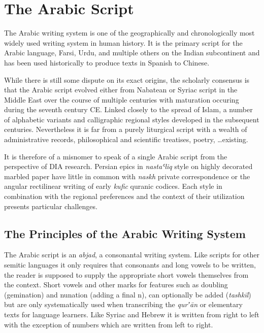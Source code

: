 \chapter{The Arabic Script}
\label{ch:arabic}
\thispagestyle{empty}
\newpage
{}

The Arabic writing system is one of the geographically and chronologically most
widely used writing system in human history. It is the primary script for the
Arabic language, Farsi, Urdu, and multiple others on the Indian subcontinent
and has been used historically to produce texts in Spanish to Chinese.

While there is still some dispute on its exact origins, the scholarly consensus
is that the Arabic script evolved either from Nabatean or Syriac script in the
Middle East over the course of multiple centuries with maturation occuring
during the seventh century CE.  Linked closely to the spread of Islam, a number
of alphabetic variants and calligraphic regional styles developed in the
subsequent centuries. Nevertheless it is far from a purely liturgical script
with a wealth of administrative records, philosophical and scientific
treatises, poetry, \dots existing.

It is therefore of a misnomer to speak of a single Arabic script from the
perspective of DIA research. Persian epics in \emph{nastaʿliq} style on highly
decorated marbled paper have little in common with \emph{naskh} private
correspondence or the angular rectilinear writing of early \emph{kufic} quranic
codices. Each style in combination with the regional preferences and the
context of their utilization presents particular challenges. 

\section{The Principles of the Arabic Writing System}

The Arabic script is an \emph{abjad}, a consonantal writing system. Like
scripts for other semitic languages it only requires that consonants and long
vowels to be written, the reader is supposed to supply the appropriate short
vowels themselves from the context. Short vowels and other marks for features
such as doubling (gemination) and nunation (adding a final n), can optionally
be added (\emph{tashkīl}) but are only systematically used when transcribing
the \emph{qurʼān} or elementary texts for language learners. Like Syriac and
Hebrew it is written from right to left with the exception of numbers which are
written from left to right.

